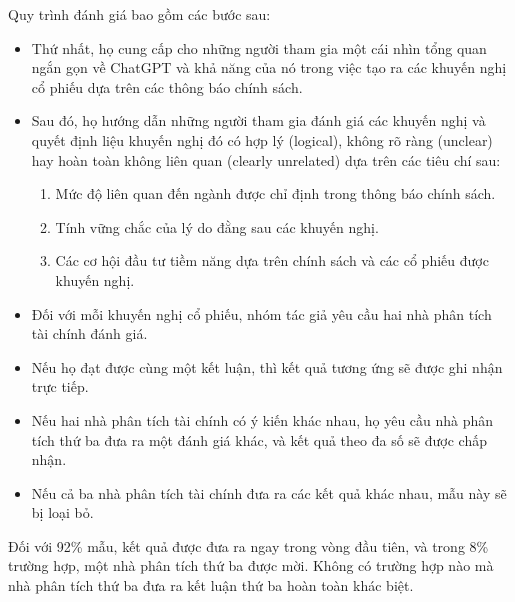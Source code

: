 \documentclass[a4paper,12pt]{article}
\begin{document}
Quy trình đánh giá bao gồm các bước sau:
\begin{itemize}
\item Thứ nhất, họ cung cấp cho những người tham gia một cái nhìn tổng quan ngắn gọn về ChatGPT và khả năng của nó trong việc tạo ra các khuyến nghị cổ phiếu dựa trên các thông báo chính sách.
\item Sau đó, họ hướng dẫn những người tham gia đánh giá các khuyến nghị và quyết định liệu khuyến nghị đó có hợp lý (logical), không rõ ràng (unclear) hay hoàn toàn không liên quan (clearly unrelated) dựa trên các tiêu chí sau:
\begin{enumerate}[label=(\alph*)]
\item Mức độ liên quan đến ngành được chỉ định trong thông báo chính sách.
\item Tính vững chắc của lý do đằng sau các khuyến nghị.
\item Các cơ hội đầu tư tiềm năng dựa trên chính sách và các cổ phiếu được khuyến nghị.
\end{enumerate}
\item Đối với mỗi khuyến nghị cổ phiếu, nhóm tác giả yêu cầu hai nhà phân tích tài chính đánh giá.
\item Nếu họ đạt được cùng một kết luận, thì kết quả tương ứng sẽ được ghi nhận trực tiếp.
\item Nếu hai nhà phân tích tài chính có ý kiến khác nhau, họ yêu cầu nhà phân tích thứ ba đưa ra một đánh giá khác, và kết quả theo đa số sẽ được chấp nhận.
\item Nếu cả ba nhà phân tích tài chính đưa ra các kết quả khác nhau, mẫu này sẽ bị loại bỏ.
\end{itemize}
Đối với 92\% mẫu, kết quả được đưa ra ngay trong vòng đầu tiên, và trong 8\% trường hợp, một nhà phân tích thứ ba được mời. Không có trường hợp nào mà nhà phân tích thứ ba đưa ra kết luận thứ ba hoàn toàn khác biệt.
\end{document}
